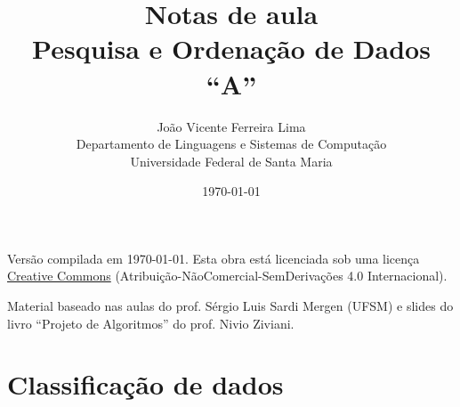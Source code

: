 \documentclass[a4paper,12pt,twoside]{report}
\title{{\bf Notas de aula\\
Pesquisa e Ordenação de Dados ``A''}}
\author{
João Vicente Ferreira Lima\\
Departamento de Linguagens e Sistemas de Computação\\
Universidade Federal de Santa Maria
}
\date{\today}
\begin{document}
\maketitle

Versão compilada em \today.
Esta obra está licenciada sob uma licença \href{http://creativecommons.org/licenses/by-nc-nd/4.0/deed.pt_BR}{Creative Commons} (Atribuição-NãoComercial-SemDerivações 4.0 Internacional).

Material baseado nas aulas do prof. Sérgio Luis Sardi Mergen (UFSM) e slides do
livro ``Projeto de Algoritmos'' do prof. Nivio Ziviani.

\pagestyle{fancy}

\setcounter{tocdepth}{3}
\setcounter{secnumdepth}{3}
\tableofcontents



\part{Classificação de dados}


\end{document}
